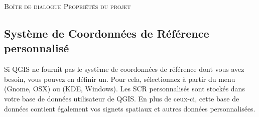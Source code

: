 \begin{Astuce}
\caption{\textsc{Boîte de dialogue Propriétés du projet}}
\end{Astuce} 

\subsection{Système de Coordonnées de Référence personnalisé}
\label{sec:customprojections}

Si QGIS ne fournit pas le système de coordonnées de référence dont vous avez
besoin, vous pouvez en définir un. Pour cela, sélectionnez
 à partir du menu
 (Gnome, OSX) ou  (KDE, Windows). 
Les SCR personnalisés sont stockés dans votre base de données utilisateur de QGIS. 
En plus de ceux-ci, cette base de données contient également vos signets 
spatiaux et autres données personnalisées.

